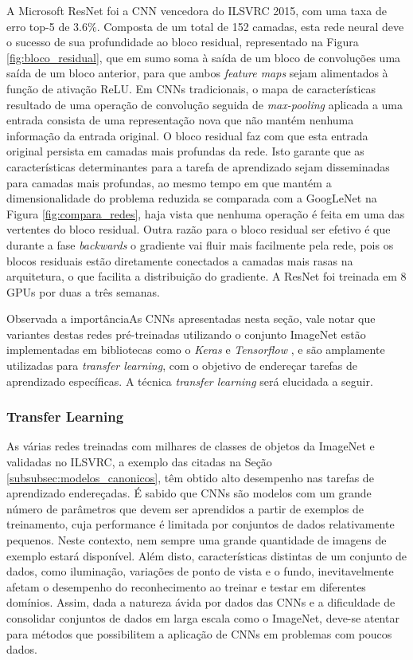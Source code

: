 A Microsoft ResNet foi a CNN vencedora do ILSVRC 2015, com uma taxa de erro top-5 de $3.6\%$. Composta de um total de 152 camadas, esta rede neural deve o sucesso de sua profundidade ao bloco residual, representado na Figura \ref{fig:bloco_residual}, que em sumo soma à saída de um bloco de convoluções uma saída de um bloco anterior, para que ambos \emph{feature maps} sejam alimentados à função de ativação ReLU. Em CNNs tradicionais, o mapa de características resultado de uma operação de convolução seguida de \emph{max-pooling} aplicada a uma entrada consista de uma representação nova que não mantém nenhuma informação da entrada original. O bloco residual faz com que esta entrada original persista em camadas mais profundas da rede. Isto garante que as características determinantes para a tarefa de aprendizado sejam disseminadas para camadas mais profundas, ao mesmo tempo em que mantém a dimensionalidade do problema reduzida se comparada com a GoogLeNet na Figura \ref{fig:compara_redes}, haja vista que nenhuma operação é feita em uma das vertentes do bloco residual. Outra razão para o bloco residual ser efetivo é que durante a fase \emph{backwards} o gradiente vai fluir mais facilmente pela rede, pois os blocos residuais estão diretamente conectados a camadas mais rasas na arquitetura, o que facilita a distribuição do gradiente. A ResNet foi treinada em 8 GPUs por duas a três semanas.

Observada a importânciaAs CNNs apresentadas nesta seção, vale notar que variantes destas redes pré-treinadas utilizando o conjunto ImageNet estão implementadas em bibliotecas como o \emph{Keras} \cite{keras:applications} e \emph{Tensorflow} \cite{tensorflow:models}, e são amplamente utilizadas para \emph{transfer learning}, com o objetivo de endereçar tarefas de aprendizado específicas. A técnica \emph{transfer learning} será elucidada a seguir.

\subsubsection{Transfer Learning}
As várias redes treinadas com milhares de classes de objetos da ImageNet e validadas no ILSVRC, a exemplo das citadas na Seção \ref{subsubsec:modelos_canonicos}, têm obtido alto desempenho nas tarefas de aprendizado endereçadas. É sabido que CNNs são modelos com um grande número de parâmetros que devem ser aprendidos a partir de exemplos de treinamento, cuja performance é limitada por conjuntos de dados relativamente pequenos. Neste contexto, nem sempre uma grande quantidade de imagens de exemplo estará disponível. Além disto, características distintas de um conjunto de dados, como iluminação, variações de ponto de vista e o fundo, inevitavelmente afetam o desempenho do reconhecimento ao treinar e testar em diferentes domínios. Assim, dada a natureza ávida por dados das CNNs e a dificuldade de consolidar conjuntos de dados em larga escala como o ImageNet, deve-se atentar para métodos que possibilitem a aplicação de CNNs em problemas com poucos dados.

